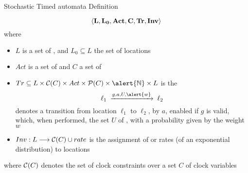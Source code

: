 \documentclass[aspectratio=169]{beamer}
\begin{document}
\begin{slide}{Stochastic Timed automata Definition}
\small

\vspace*{-1mm}
\begin{equation*}
\mathbf{\langle L, L_0, Act, C, Tr, Inv \rangle}
\end{equation*}
\vspace*{-1mm}
where
\vspace*{-1mm}
\begin{itemize}
\item $L$ is a set of , and $L_0 \subseteq L$ the set of  locations
\item $Act$ is a set of  and $C$ a set of 
\item $Tr \subseteq L \times \cc{C} \times Act \times \pow{(C)} \times \alert{\N} \times L$ is the 
\vspace*{-1mm}
\begin{equation*}
\ell_1\; \trans{g,a,U,\alert{w}}\;  \ell_2
\end{equation*}
\vspace*{-1mm}
denotes a transition from location $\ell_1$ to $\ell_2$,  by $a$, enabled if  $g$
is valid, which, when performed,  the set $U$ of , \alert{with a probability given by the weight~$w$}
\item $Inv: L \longrightarrow \mathcal{C}(C)\cup rate$ is the assignment of  \alert{or rates (of an exponential distribution)} to locations  
\end{itemize}
\vspace*{-1mm}
where $\mathcal{C}(C)$ denotes the  set of clock constraints over a set $C$ of clock variables
\end{slide}
\end{document}
